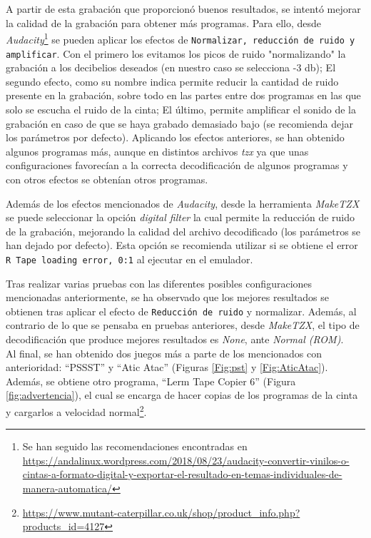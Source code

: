\documentclass{article}
\begin{document}
A partir de esta grabación que proporcionó buenos resultados, se intentó mejorar la calidad de la grabación para obtener más programas. Para ello, desde \textit{Audacity}\footnote{Se han seguido las recomendaciones encontradas en \url{https://andalinux.wordpress.com/2018/08/23/audacity-convertir-vinilos-o-cintas-a-formato-digital-y-exportar-el-resultado-en-temas-individuales-de-manera-automatica/}} se pueden aplicar los efectos de \texttt{Normalizar, reducción de ruido y amplificar}. Con el primero los evitamos los picos de ruido "normalizando" la grabación a los decibelios deseados (en nuestro caso se selecciona -3 db); El segundo efecto, como su nombre indica permite reducir la cantidad de ruido presente en la grabación, sobre todo en las partes entre dos programas en las que solo se escucha el ruido de la cinta; El último, permite amplificar el sonido de la grabación en caso de que se haya grabado demasiado bajo (se recomienda dejar los parámetros por defecto). 
Aplicando los efectos anteriores, se han obtenido algunos programas más, aunque en distintos archivos \textit{tzx} ya que unas configuraciones favorecían a la correcta decodificación de algunos programas y con otros efectos se obtenían otros programas. \par
Además de los efectos mencionados de \textit{Audacity}, desde la herramienta \textit{MakeTZX} se puede seleccionar la opción \textit{digital filter} la cual permite la reducción de ruido de la grabación, mejorando la calidad del archivo decodificado (los parámetros se han dejado por defecto). Esta opción se recomienda utilizar si se obtiene el error \texttt{R Tape loading error, 0:1} al ejecutar en el emulador.

Tras realizar varias pruebas con las diferentes posibles configuraciones mencionadas anteriormente, se ha observado que los mejores resultados se obtienen tras aplicar el efecto de \texttt{Reducción de ruido} y normalizar. Además, al contrario de lo que se pensaba en pruebas anteriores, desde \textit{MakeTZX}, el tipo de decodificación que produce mejores resultados es \textit{None}, ante \textit{Normal (ROM)}.\\

Al final, se han obtenido dos juegos más a parte de los mencionados con anterioridad: ``PSSST'' y ``Atic Atac'' (Figuras \ref{Fig:pst} y \ref{Fig:AticAtac}). Además, se obtiene otro programa, ``Lerm Tape Copier 6'' (Figura \ref{fig:advertencia}), el cual se encarga de hacer copias de los programas de la cinta y cargarlos a velocidad normal\footnote{\url{https://www.mutant-caterpillar.co.uk/shop/product_info.php?products_id=4127}}.\\
\end{document}

